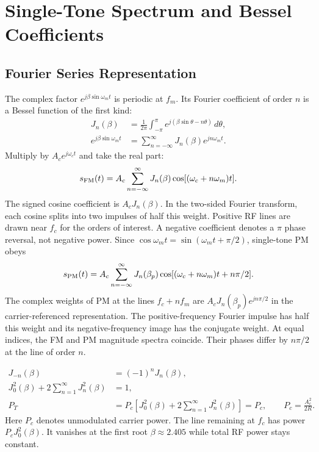 \documentclass[12pt,a4paper]{article}
\begin{document}
\section{Single-Tone Spectrum and Bessel Coefficients}
\subsection{Fourier Series Representation}
The complex factor $e^{j\beta\sin\omega_mt}$ is periodic at $f_m$. Its Fourier coefficient of order $n$ is a Bessel function of the first kind:
\[
\begin{aligned}
 J_n(\beta)&=\frac{1}{2\pi}\int_{-\pi}^{\pi}
            e^{j(\beta\sin\theta-n\theta)}\,d\theta,\\
 e^{j\beta\sin\omega_mt}&=\sum_{n=-\infty}^{\infty}
            J_n(\beta)e^{jn\omega_mt}.
\end{aligned}
\]
Multiply by $A_ce^{j\omega_ct}$ and take the real part:
\[
 s_{\rm FM}(t)=A_c\sum_{n=-\infty}^{\infty}
          J_n(\beta)\cos[(\omega_c+n\omega_m)t].
\]
The signed cosine coefficient is $A_cJ_n(\beta)$. In the two-sided Fourier transform, each cosine splits into two impulses of half this weight. Positive RF lines are drawn near $f_c$ for the orders of interest. A negative coefficient denotes a $\pi$ phase reversal, not negative power. Since $\cos\omega_mt=\sin(\omega_mt+\pi/2)$, single-tone PM obeys
\[
 s_{\rm PM}(t)=A_c\sum_{n=-\infty}^{\infty}
 J_n(\beta_p)\cos[(\omega_c+n\omega_m)t+n\pi/2].
\]
The complex weights of PM at the lines $f_c+nf_m$ are $A_cJ_n(\beta_p)e^{jn\pi/2}$ in the carrier-referenced representation. The positive-frequency Fourier impulse has half this weight and its negative-frequency image has the conjugate weight. At equal indices, the FM and PM magnitude spectra coincide. Their phases differ by $n\pi/2$ at the line of order $n$.

\begin{tcolorbox}[formulabox, title={Bessel Identities and Spectrum Power}]
\[
\begin{aligned}
 J_{-n}(\beta)&=(-1)^n J_n(\beta),\\
 J_0^2(\beta)+2\sum_{n=1}^{\infty}J_n^2(\beta)&=1,\\
 P_T&=P_c\left[J_0^2(\beta)+2\sum_{n=1}^{\infty}J_n^2(\beta)\right]
      =P_c,\qquad P_c=\frac{A_c^2}{2R}.
\end{aligned}
\]
Here $P_c$ denotes unmodulated carrier power. The line remaining at $f_c$ has power $P_c J_0^2(\beta)$. It vanishes at the first root $\beta\approx2.405$ while total RF power stays constant.
\end{tcolorbox}
\end{document}
